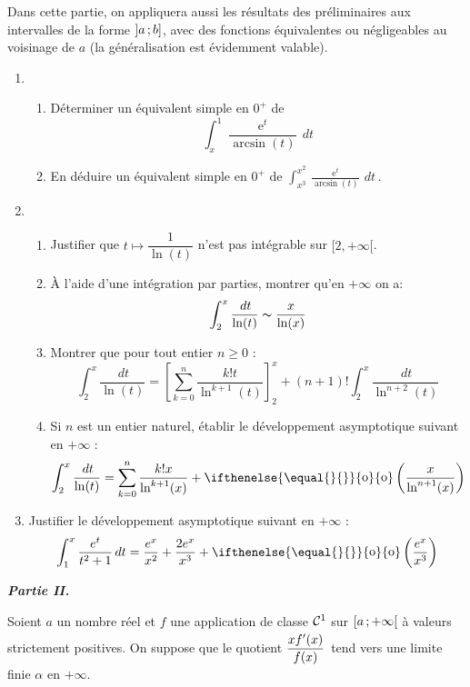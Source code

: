 \documentclass[twoside,french,11pt]{VcCours}
\DeclareMathOperator{\e}{e}
\newcommand{\ud}{\,d} %
\DeclareMathOperator*{\mypetito}{o}
\newcommand{\petito}[1][]{\ifthenelse{\equal{#1}{}}{\mypetito\limits}
  {{\mypetito\limits_{#1}}}}
\newcommand{\intervalle}[4]{\mathopen{}\mathclose\bgroup\left#1#2\mathclose{}\mathpunct{};#3\aftergroup\egroup\right#4}
\newcommand{\intof}[2]{\intervalle{]}{#1}{#2}{]}}
\newcommand{\intfo}[2]{\intervalle{[}{#1}{#2}{[}}
\begin{document}
\medskip

Dans cette partie, on appliquera aussi les résultats des préliminaires aux intervalles de la forme $\intof{a}b$, avec des fonctions équivalentes ou négligeables au voisinage de $a$ (la généralisation  est évidemment valable). 

\medskip


\begin{enumerate}
\item  ~
\begin{enumerate}
\item  Déterminer un équivalent simple en $0^+$ de 
\[
\int_x^1\frac{\e^t}{\arcsin(t)}\ud t
\]

\item En déduire un équivalent simple en $0^+$ de $\int_{x^3}^{x^2}\frac{\e^t}{\arcsin(t)}\ud t\,.$\smallbreak

\end{enumerate}

\item ~
\begin{enumerate}
\item Justifier que $t \mapsto \dfrac{1}{\ln(t)}$ n'est pas intégrable sur $[2, + \infty[$.
\item \`A l'aide d'une intégration par parties, montrer qu'en $+\infty$ on a:
\[
\int_2^x\frac{\ud t}{\ln(t)}\thicksim \frac{x}{\ln(x)}
\]
\item Montrer que pour tout entier $n \geq 0$ : 
\[
  \int_2^x\frac{\ud t}{\ln(t)}=\left[\sum_{k=0}^{n}\frac{k!t}{\ln^{k+1}(t)}\right]_2^x +(n+1)!\int_2^x\frac{\ud t}{\ln^{n+2}(t)}
\]
\item Si $n$ est un entier naturel, établir le développement asymptotique suivant en $+\infty$ :
\[
\int_2^x\frac{\ud t}{\ln(t)}=\sum_{k=0}^n\frac{k!x}{\ln^{k+1}(x)}+\petito\left ( \frac{x}{\ln^{n+1}(x)}\right )
\]
\end{enumerate}

\item Justifier le développement asymptotique suivant en $+\infty$ :
\[
\int_1^x\frac{e^t}{t^2+1}\ud t=\frac{e^x}{x^2}+\frac{2e^x}{x^3}+\petito\left
(\frac{e^x}{x^3}\right )
\]

\end{enumerate}\bigbreak

\bigskip

\centerline{\it \textbf{\Large  Partie II.}}\medbreak

\medskip

Soient $a$ un nombre réel et $f$ une application de classe ${\cal C}^1$ sur
$\intfo{a}{+\infty}$ \`a valeurs strictement positives. On suppose que le quotient
$\dfrac{xf'(x)}{f(x)}^{\mathstrut}$ tend vers une limite finie $\alpha$ en $+\infty$.
\end{document}
